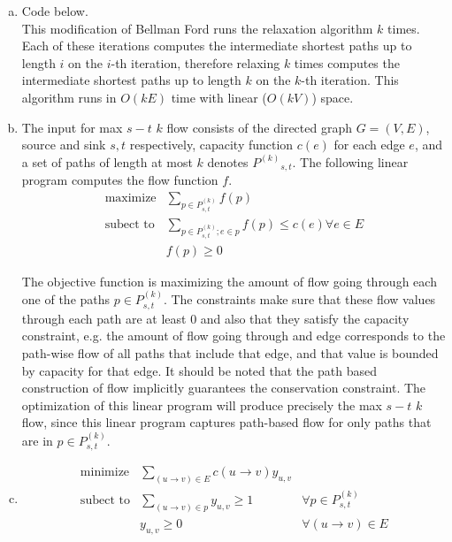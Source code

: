 \documentclass[11pt]{article}
\begin{document}



\begin{enumerate}[(a)]

\item
\begin{solution}
    Code below. \\

    This modification of Bellman Ford runs the relaxation algorithm $k$ times. Each of these iterations computes the intermediate shortest paths up to length $i$ on the $i$-th iteration, therefore relaxing $k$ times computes the intermediate shortest paths up to length $k$ on the $k$-th iteration. This algorithm runs in $O(kE)$ time with linear ($O(kV)$) space.
\end{solution}

\item
\begin{solution}
    The input for max $s-t$ $k$ flow consists of the directed graph $G = (V,E)$, source and sink $s,t$ respectively, capacity function $c(e)$ for each edge $e$, and a set of paths of length at most $k$ denotes ${P^{(k)}}_{s,t}$. The following linear program computes the flow function $f$.
    \begin{align*}
        \text{maximize} & \sum_{p \in P^{(k)}_{s,t}} f(p) \\
        \text{subect to} & \sum_{p \in P^{(k)}_{s,t}; e \in p} f(p) \leq c(e) \forall e \in E \\
        & f(p) \geq 0
    \end{align*}

    The objective function is maximizing the amount of flow going through each one of the paths ${p \in P^{(k)}_{s,t}}$. The constraints make sure that these flow values through each path are at least $0$ and also that they satisfy the capacity constraint, e.g. the amount of flow going through and edge corresponds to the path-wise flow of all paths that include that edge, and that value is bounded by capacity for that edge. It should be noted that the path based construction of flow implicitly guarantees the conservation constraint. The optimization of this linear program will produce precisely the max $s-t$ $k$ flow, since this linear program captures path-based flow for only paths that are in ${p \in P^{(k)}_{s,t}}$.
\end{solution}

\item
\begin{solution}
    \begin{align*}
        \text{minimize} & \sum_{(u \to v) \in E} c(u \to v) y_{u,v} & \\
        \text{subect to} & \sum_{(u \to v) \in p} y_{u,v} \geq 1 & \forall {p \in P^{(k)}_{s,t}} \\
        & y_{u,v} \geq 0 & \forall (u \to v) \in E
    \end{align*}


\end{solution}
\end{enumerate}
\end{document}
